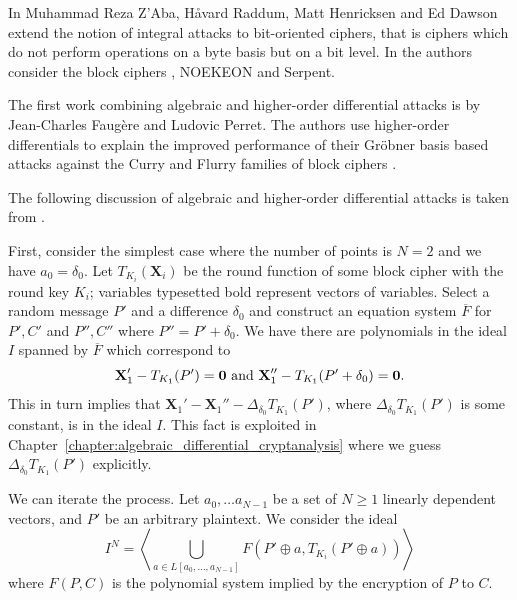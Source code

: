 In \cite{bit-pattern-ia} Muhammad Reza Z'Aba, Håvard Raddum, Matt Henricksen and Ed Dawson extend the notion of integral attacks to bit-oriented ciphers, that is ciphers which do not perform operations on a byte basis but on a bit level. In \cite{bit-pattern-ia} the authors consider the block ciphers \PRESENT, NOEKEON and Serpent.

The first work combining algebraic and higher-order differential attacks is \cite{algebraic-higher-order-dc} by Jean-Charles Faugère and Ludovic Perret. The authors use 
higher-order differentials to explain the improved performance of their Gröbner basis based attacks against the Curry and Flurry families of block ciphers \cite{flurry-curry}. 

The following discussion of algebraic and higher-order differential attacks is taken from \cite{algebraic-higher-order-dc}.

First, consider the simplest case where the number of points is $N=2$ and we have $a_0 = \delta_0$. Let $T_{K_i}(\textbf{X}_i)$ be the round function of some block cipher with the round key $K_i$; variables typesetted  bold represent vectors of variables. Select a random message $P'$ and a difference $\delta_0$ and construct an equation system $\overline{F}$ for $P',C'$ and $P'',C''$ where $P'' = P' + \delta_0$. We have there are polynomials in the ideal $I$ spanned by $\overline{F}$ which correspond to
\begin{eqnarray*}
\textbf{X}_1' - T_{K_1}(P') = \textbf{0} \textnormal{ and }
\textbf{X}_1'' - T_{K_1}(P' + \delta_0) = \textbf{0}.
\end{eqnarray*}
This in turn implies that $\textbf{X}_1' - \textbf{X}_1''- \Delta_{\delta_0} T_{K_1}(P')$, where $\Delta_{\delta_0} T_{K_1}(P')$ is some constant, is in the ideal $I$. This fact is exploited in  Chapter~\ref{chapter:algebraic_differential_cryptanalysis} where we guess $\Delta_{\delta_0} T_{K_1}(P')$ explicitly.

We can iterate the process. Let $a_0,\dots a_{N-1}$ be a set of $N ≥ 1$ linearly dependent vectors, and $P'$ be an arbitrary plaintext. We consider the ideal
$$I^N = \left\langle \bigcup_{a \in L[a_0,\dots,a_{N-1}]} F(P' \oplus a, T_{K_i}(P' \oplus a))\right\rangle$$
where $F(P,C)$ is the polynomial system implied by the encryption of $P$ to $C$.


